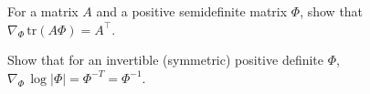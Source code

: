 \documentclass{article}
\begin{document}
\begin{exercise}
For a matrix $A$ and a positive semidefinite matrix $\Phi$, show that
$\nabla_{\Phi}\,\mathrm{tr}(A\Phi)=A^\top$.
\end{exercise}

\begin{exercise}
Show that for an invertible (symmetric) positive definite $\Phi$,
$\nabla_{\Phi}\,\log|\Phi|=\Phi^{-T}=\Phi^{-1}$.
\end{exercise}






\end{document}
